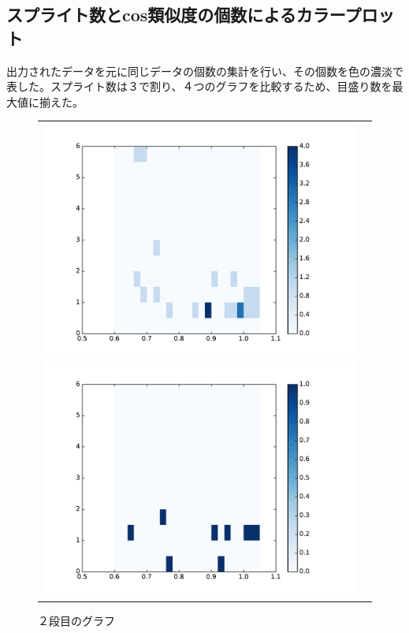 \documentclass[a4paper,10pt,onecolumn,oneside,openany]{jsbook}
\begin{document}
 
  \subsection{スプライト数とcos類似度の個数によるカラープロット}
出力されたデータを元に同じデータの個数の集計を行い、その個数を色の濃淡で表した。スプライト数は３で割り、４つのグラフを比較するため、目盛り数を最大値に揃えた。 
 
\begin{figure}[h]
 \begin{tabular}{cc}
 	\begin{minipage}[t]{0.45\hsize}
	 \centering
	 \includegraphics[keepaspectratio, scale = 0.35]{colormap_maze_splite_1.pdf}
	 \caption{１段目のグラフ}
	 \label{first_maze_splite_color}
	\end{minipage}
        \begin{minipage}[t]{0.45\hsize}
	 \centering
	 \includegraphics[keepaspectratio, scale = 0.35]{colormap_maze_splite_2.pdf}
	 \caption{２段目のグラフ}
	 \label{second_maze_splite_color}
	\end{minipage}
 \end{tabular}
 \end{figure}
\end{document}
